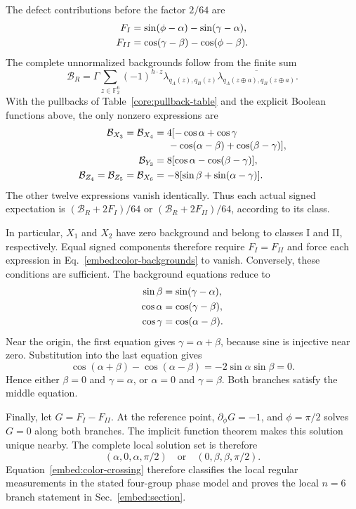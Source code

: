 The defect contributions before the factor $2/64$ are
\begin{align}
 F_I&=\sin(\phi-\alpha)-\sin(\gamma-\alpha),\notag\\
 F_{II}&=\cos(\gamma-\beta)-\cos(\phi-\beta).
 \label{embed:color-defect}
\end{align}
The complete unnormalized backgrounds follow from the finite sum
\begin{equation}
 \mathcal B_R=\Gamma\sum_{z\in\mathbb F_2^6}(-1)^{h\cdot z}
 \lambda_{q_A(z),q_B(z)}
 \overline{\lambda_{q_A(z\oplus a),q_B(z\oplus a)}}.
 \label{embed:color-sum}
\end{equation}
With the pullbacks of Table~\ref{core:pullback-table} and the explicit Boolean functions above, the only nonzero expressions are
\begin{align}
 \mathcal B_{X_3}=\mathcal B_{X_4}
 &=4[-\cos\alpha+\cos\gamma\notag\\[-2pt]
 &\hspace{1.4em}-\cos(\alpha-\beta)+\cos(\beta-\gamma)],\notag\\
 \mathcal B_{Y_3}&=8[\cos\alpha-\cos(\beta-\gamma)],\notag\\
 \mathcal B_{Z_4}=\mathcal B_{Z_5}=\mathcal B_{X_6}
 &=-8[\sin\beta+\sin(\alpha-\gamma)].
 \label{embed:color-backgrounds}
\end{align}
The other twelve expressions vanish identically. Thus each actual signed expectation is $(\mathcal B_R+2F_I)/64$ or $(\mathcal B_R+2F_{II})/64$, according to its class.

In particular, $X_1$ and $X_2$ have zero background and belong to classes I and II, respectively. Equal signed components therefore require $F_I=F_{II}$ and force each expression in Eq.~\eqref{embed:color-backgrounds} to vanish. Conversely, these conditions are sufficient. The background equations reduce to
\begin{align}
 \sin\beta&=\sin(\gamma-\alpha),\notag\\
 \cos\alpha&=\cos(\gamma-\beta),\notag\\
 \cos\gamma&=\cos(\alpha-\beta).
 \label{embed:color-equations}
\end{align}
Near the origin, the first equation gives $\gamma=\alpha+\beta$, because sine is injective near zero. Substitution into the last equation gives
\[
 \cos(\alpha+\beta)-\cos(\alpha-\beta)
 =-2\sin\alpha\sin\beta=0.
\]
Hence either $\beta=0$ and $\gamma=\alpha$, or $\alpha=0$ and $\gamma=\beta$. Both branches satisfy the middle equation.

Finally, let $G=F_I-F_{II}$. At the reference point, $\partial_\phi G=-1$, and $\phi=\pi/2$ solves $G=0$ along both branches. The implicit function theorem makes this solution unique nearby. The complete local solution set is therefore
\begin{equation}
 (\alpha,0,\alpha,\pi/2)\quad\text{or}\quad(0,\beta,\beta,\pi/2).
 \label{embed:color-crossing}
\end{equation}
Equation~\eqref{embed:color-crossing} therefore classifies the local regular measurements in the stated four-group phase model and proves the local $n=6$ branch statement in Sec.~\ref{embed:section}.
